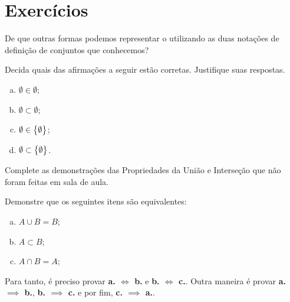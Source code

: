 \section{Exercícios}

\begin{exercise}
\label{exe:vazio-notacao}
	De que outras formas podemos representar o  utilizando as duas notações de definição de conjuntos que conhecemos?
\end{exercise}


\begin{exercise}
	Decida quais das afirmações a seguir estão corretas. Justifique suas respostas.
	\begin{enumerate}[a.]
		\item $\emptyset \in \emptyset$;
		\item $\emptyset \subset \emptyset$;
		\item $\emptyset \in \left\{ \emptyset\right\}$;
		\item $\emptyset \subset \left\{ \emptyset\right\}$.
	\end{enumerate}
\end{exercise}



\begin{exercise}
Complete as demonstrações das Propriedades da União e Interseção que não foram feitas em sala de aula.
\end{exercise}

\begin{exercise}
Demonstre que os seguintes itens são equivalentes:
	\begin{enumerate}[a.]
		\item $A \cup B = B$;
		\item $A \subset B$;
		\item $A \cap B = A$;
	\end{enumerate}
	\begin{tip}
		Para tanto, é preciso provar \textbf{a. $\iff$ b.} e \textbf{b. $\iff$ c.}.
		Outra maneira é provar \textbf{a. $\implies$ b.}, \textbf{b. $\implies$ c.} e por fim, \textbf{c. $\implies$ a.}.
	\end{tip}
\end{exercise}

